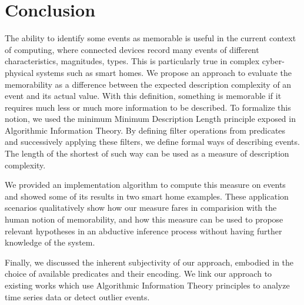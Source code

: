 \documentclass[entropy,article,submit,moreauthors,pdftex]{Definitions/mdpi}
\begin{document}
\section{Conclusion}
The ability to identify some events as memorable is useful in the current context of computing, where connected devices record many events of different characteristics, magnitudes, types. This is particularly true in complex cyber-physical systems such as smart homes. We propose an approach to evaluate the memorability as a difference between the expected description complexity of an event and its actual value. With this definition, something is memorable if it requires much less or much more information to be described. To formalize this notion, we used the minimum Minimum Description Length principle exposed in Algorithmic Information Theory. By defining filter operations from predicates and successively applying these filters, we define formal ways of describing events. The length of the shortest of such way can be used as a measure of description complexity.

We provided an implementation algorithm to compute this measure on events and showed some of its results in two smart home examples. These application scenarios qualitatively show how our measure fares in comparision with the human notion of memorability, and how this measure can be used to propose relevant hypotheses in an abductive inference process without having further knowledge of the system. 

Finally, we discussed the inherent subjectivity of our approach, embodied in the choice of available predicates and their encoding. We link our approach to existing works which use Algorithmic Information Theory principles to analyze time series data or detect outlier events.




\end{document}
